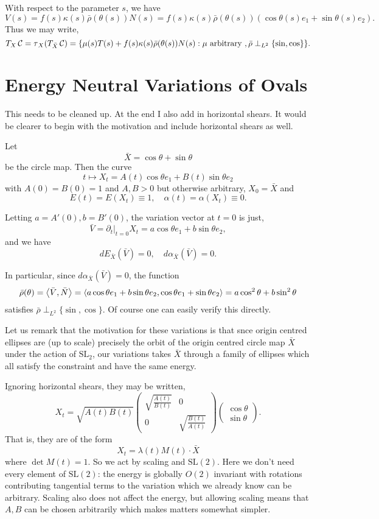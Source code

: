 \documentclass[12pt]{article}
\begin{document}
With respect to the parameter \(s\), we have
\[
V(s) = f(s) \kappa(s) \bar{\rho}(\theta(s)) N(s) = f(s) \kappa(s) \bar{\rho}(\theta(s))(\cos\theta(s) e_1 + \sin\theta(s) e_2).
\]
Thus we may write,
\[
T_X \operatorname{\mathcal{C}} = \operatorname{\tau}_X(T_{\bar{X}} \operatorname{\mathcal{C}}) = \{\mu(s) T(s) + f(s) \kappa(s) \bar{\rho}(\theta(s)) N(s) : \mu \text{ arbitrary }, \bar{\rho} \perp_{L^2} \{\sin, \cos\}\}.
\]

\section{Energy Neutral Variations of Ovals}

{\color{red} This needs to be cleaned up. At the end I also add in horizontal shears. It would be clearer to begin with the motivation and include horizontal shears as well.}

Let
\[
\bar{X} = \cos\theta + \sin \theta
\]
be the circle map. Then the curve
\[
t \mapsto X_t = A(t) \cos\theta e_1 + B(t) \sin \theta e_2
\]
with \(A(0) = B(0) = 1\) and \(A, B > 0\) but otherwise arbitrary, \(X_0 = \bar{X}\) and
\[
E(t) = E(X_t) \equiv 1, \quad \alpha(t) = \alpha(X_t) \equiv 0.
\]

Letting \(a = A'(0), b = B'(0)\), the variation vector at \(t = 0\) is just,
\[
\bar{V} = \partial_t|_{t=0} X_t = a \cos\theta e_1 + b \sin\theta e_2,
\]
and we have
\[
dE_{\bar{X}} (\bar{V}) = 0, \quad d\alpha_{\bar{X}} (\bar{V}) = 0.
\]

In particular, since \(d\alpha_{\bar{X}} (\bar{V}) = 0\), the function
\[
\bar{\rho} (\theta) = \left\langle{\bar{V}},{\bar{N}}\right\rangle = \left\langle{a \cos\theta e_1 + b \sin\theta e_2},{\cos\theta e_1 + \sin\theta e_2}\right\rangle = a \cos^2\theta + b \sin^2\theta
\]
satisfies \(\bar{\rho} \perp_{L^2} \{\sin, \cos\}\). Of course one can easily verify this directly.

Let us remark that the motivation for these variations is that snce origin centred ellipses are (up to scale) precisely the orbit of the origin centred circle map \(\bar{X}\) under the action of \(\text{SL}_2\), our variations takes \(\bar{X}\) through a family of ellipses which all satisfy the constraint and have the same energy.

Ignoring horizontal shears, they may be written,
\[
X_t = \sqrt{A(t) B(t)}
\begin{pmatrix}
\sqrt{\frac{A(t)}{B(t)}} & 0 \\
0 & \sqrt{\frac{B(t)}{A(t)}}
\end{pmatrix}
\begin{pmatrix}
\cos \theta \\
\sin \theta
\end{pmatrix}.
\]
That is, they are of the form
\[
X_t = \lambda(t) M(t) \cdot \bar{X}
\]
where \(\det M(t) = 1\). So we act by scaling and \(\text{SL}(2)\). Here we don't need every element of \(\text{SL}(2)\): the energy is globally \(O(2)\) invariant with rotations contributing tangential terms to the variation which we already know can be arbitrary. Scaling also does not affect the energy, but allowing scaling means that \(A, B\) can be chosen arbitrarily which makes matters somewhat simpler.
\end{document}
